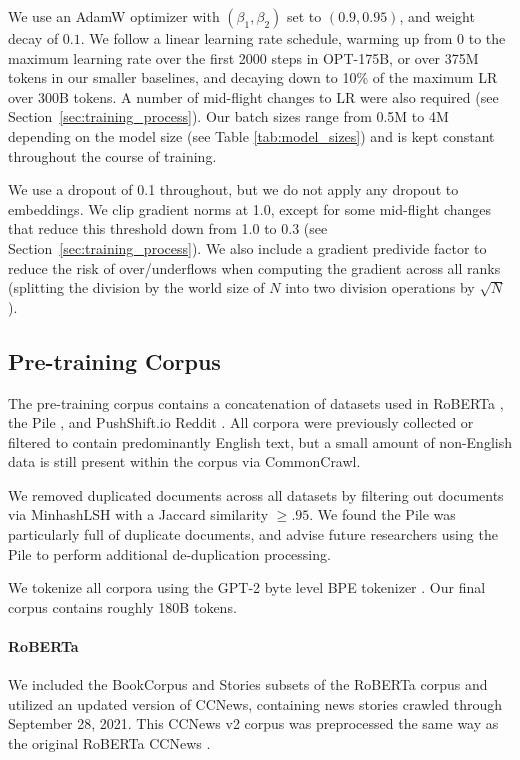 We use an AdamW optimizer \cite{AdamW} with $(\beta_1,\beta_2)$ set to $(0.9, 0.95)$, and weight decay of $0.1$.  We follow a linear learning rate schedule, warming up from $0$ to the maximum learning rate over the first 2000 steps in OPT-175B, or over 375M tokens in our smaller baselines, and decaying down to 10\% of the maximum LR over 300B tokens.  A number of mid-flight changes to LR were also required (see Section~\ref{sec:training_process}).  Our batch sizes range from 0.5M to 4M depending on the model size (see Table \ref{tab:model_sizes}) and is kept constant throughout the course of training.

We use a dropout of 0.1 throughout, but we do not apply any dropout to embeddings. We clip gradient norms at 1.0, except for some mid-flight changes that reduce this threshold down from 1.0 to 0.3 (see Section~\ref{sec:training_process}).  We also include a gradient predivide factor to reduce the risk of over/underflows when computing the gradient across all ranks (splitting the division by the world size of $N$ into two division operations by $\sqrt{N}$).

\subsection{Pre-training Corpus}
\label{sec:training_dataset}
The pre-training corpus contains a concatenation of datasets used in RoBERTa \cite{liu2019roberta}, the Pile \cite{thepile}, and PushShift.io Reddit \cite{reddit2020, roller-etal-2021-recipes}. All corpora were previously collected or filtered to contain predominantly English text, but a small amount of non-English data is still present within the corpus via CommonCrawl.

We removed duplicated documents across all datasets by filtering out documents via MinhashLSH \cite{rajaraman2011mining} with a Jaccard similarity $\geq.95$. We found the Pile was particularly full of duplicate documents, and advise future researchers using the Pile to perform additional de-duplication processing.

We tokenize all corpora using the GPT-2 byte level BPE tokenizer \cite{sennrich2016bpe,radford2019language,brown2020gpt3}. Our final corpus contains roughly 180B tokens.

\paragraph{RoBERTa} We included the BookCorpus \cite{books2015} and Stories \cite{ccstories2018} subsets of the RoBERTa corpus and utilized an updated version of CCNews, containing news stories crawled through September 28, 2021. This CCNews v2 corpus was preprocessed the same way as the original RoBERTa CCNews \cite{liu2019roberta}.

